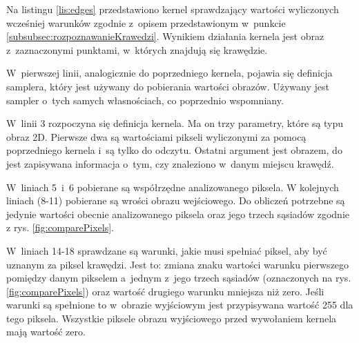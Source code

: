 Na listingu \ref{lis:edges} przedstawiono kernel sprawdzający wartości wyliczonych wcześniej warunków zgodnie z~opisem przedstawionym w~punkcie \ref{subsubsec:rozpoznawanieKrawedzi}. Wynikiem działania kernela jest obraz z~zaznaczonymi punktami, w~których znajdują się krawędzie.

W~pierwszej linii, analogicznie do poprzedniego kernela, pojawia się definicja samplera, który jest używany do pobierania wartości obrazów. Używany jest sampler o~tych samych własnościach, co poprzednio wspomniany.

W~linii 3 rozpoczyna się definicja kernela. Ma on trzy parametry, które są typu obraz 2D. Pierwsze dwa są wartościami pikseli wyliczonymi za pomocą poprzedniego kernela i~są tylko do odczytu. Ostatni argument jest obrazem, do jest zapisywana informacja o~tym, czy znaleziono w~danym miejscu krawędź.

W~liniach 5~i~6 pobierane są współrzędne analizowanego piksela. W kolejnych liniach (8-11) pobierane są wrości obrazu wejściowego. Do obliczeń potrzebne są jedynie wartości obecnie analizowanego piksela oraz jego trzech sąsiadów zgodnie z rys. \ref{fig:comparePixels}.

W~liniach 14-18 sprawdzane są warunki, jakie musi spełniać piksel, aby być uznanym za piksel krawędzi. Jest to: zmiana znaku wartości warunku pierwszego pomiędzy danym pikselem a~jednym z~jego trzech sąsiadów (oznaczonych na rys. \ref{fig:comparePixels}) oraz wartość drugiego warunku mniejsza niż zero. Jeśli warunki są spełnione to w~obrazie wyjściowym jest przypisywana wartość 255 dla tego piksela. Wszystkie piksele obrazu wyjściowego przed wywołaniem kernela mają wartość zero.
